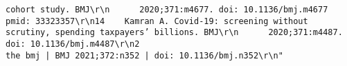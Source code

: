 \documentclass[
]{book}
\begin{document}
\begin{verbatim}
cohort study. BMJ\r\n      2020;371:m4677. doi: 10.1136/bmj.m4677 pmid: 33323357\r\n14    Kamran A. Covid-19: screening without scrutiny, spending taxpayers’ billions. BMJ\r\n      2020;371:m4487. doi: 10.1136/bmj.m4487\r\n2                                                                                                          the bmj | BMJ 2021;372:n352 | doi: 10.1136/bmj.n352\r\n"                                                                                                                                                                                                                                                                                                                                                                                                                                                                                                                                                                                                                                                                                                                                                                                                                                                                                                                                                                                                                                                                                                                                                                                                                                                                                                                                                                                                                                                                                                                                                                                                                                                                                                                                                                                                                                                                                                                                                                                                                                                                                                                                                                                                                                                                                                                                                                                                                                                                                                                                                                                                                                                                                                                                                                                                                                                                                                                                                                                                                                                     
\end{verbatim}
\end{document}
